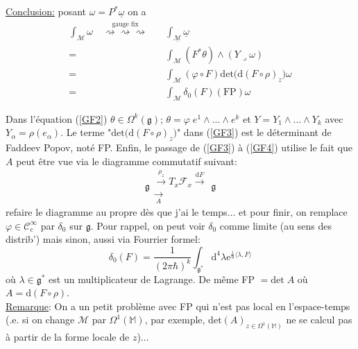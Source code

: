 \documentclass[a4paper,11pt]{article}
\renewcommand{\d}{{\mathrm{d}}}
\newcommand{\e}{{\mathrm{e}}}
\begin{document}
\noindent \underline{Conclusion:} posant $\omega = P^* \underline{\omega}$ on a
\begin{align}
\int_\mathcal{M} \omega \quad \overset{\mathrm{gauge}\;\mathrm{fix}}{\rightsquigarrow\rightsquigarrow\rightsquigarrow}
\quad & \int_{\underline{\mathcal{M}}} \underline{\omega}\\
=& \int_\mathcal{M} (F^* \theta) \wedge (Y\lrcorner \omega)\label{GF2}\\
=& \int_\mathcal{M} (\varphi\circ F) \mathrm{det} \Big( \d (F\circ\rho)_z\Big) \omega\label{GF3}\\
=& \int_\mathcal{M} \delta_0 (F) (\mathrm{FP}) \omega \label{GF4}
\end{align}

Dans l'équation (\ref{GF2}) $\theta \in \Omega^k(\mathfrak{g})$; $\theta=\varphi\; e^1\wedge...\wedge e^k$ et $Y= Y_1 \wedge ... \wedge Y_k$ avec $Y_\alpha = \rho(e_\alpha)$. Le terme "$\mathrm{det} \Big(\d (F\circ\rho)_z\Big)$" dans (\ref{GF3}) est le déterminant de Faddeev Popov, noté FP. Enfin, le passage de (\ref{GF3}) à (\ref{GF4}) utilise le fait que $A$ peut être vue via le diagramme commutatif suivant:
$$\mathfrak{g}
\begin{matrix}
\overset{\rho_z}\to T_x\mathcal{F}_x \overset{\d F} \to \\
\underset A \longrightarrow
\end{matrix}
\mathfrak{g}$$
\color{red} refaire le diagramme au propre dès que j'ai le temps...\color{black} et pour finir, on remplace $\varphi \in \mathcal{C}^\infty_\mathrm{c}$ par $\delta_0$ sur $\mathfrak{g}$. Pour rappel, on peut voir $\delta_0$ comme limite (au sens des distrib') mais sinon, aussi via Fourrier formel:
$$\delta_0(F) = \frac{1}{(2\pi\hbar)^k}\int_{\mathfrak{g}^*} \d^4\lambda \e^{\frac{i}{\hbar}\langle\lambda,F\rangle}$$
où $\lambda \in \mathfrak{g}^*$ est un multiplicateur de Lagrange. De même FP $= \mathrm{det} \; A$ où $A=\d (F\circ \rho)$.\\

\underline{Remarque}: On a un petit problème avec FP qui n'est pas local en l'espace-temps (.e. si on change $\mathcal M$ par $\Omega^1(\mathbb M)$, par exemple, $\mathrm{det}(A)_{z\in\Omega^1(\mathbb M)}$ ne se calcul pas à partir de la forme locale de $z$)...
\end{document}
